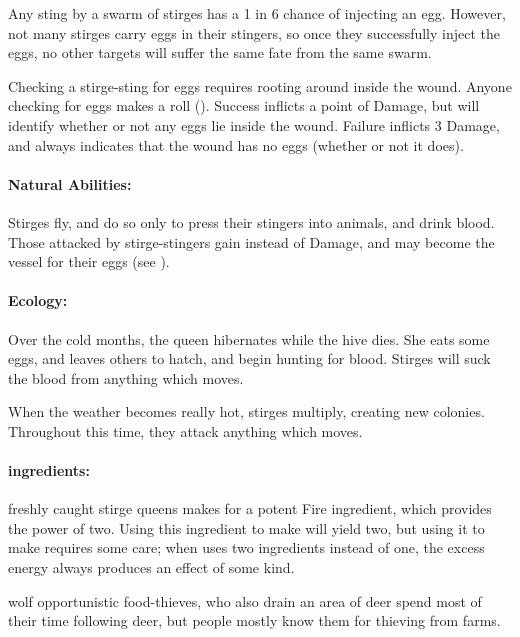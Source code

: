 \begin{multicols}{2}
\label{stirgeEggs}
Any sting by a swarm of stirges has a 1 in 6 chance of injecting an egg.
However, not many stirges carry eggs in their stingers, so once they successfully inject the eggs, no other targets will suffer the same fate from the same swarm.

Checking a stirge-sting for eggs requires rooting around inside the wound.
Anyone checking for eggs makes a  roll (\tn[12]).
Success inflicts a point of Damage, but will identify whether or not any eggs lie inside the wound.
Failure inflicts 3 Damage, and always indicates that the wound has no eggs (whether or not it does).

\paragraph{Natural Abilities:}
Stirges fly, and do so only to press their stingers into animals, and drink blood.
Those attacked by stirge-stingers gain  instead of Damage, and may become the vessel for their eggs (see ).

\paragraph{Ecology:}
Over the cold months, the queen hibernates while the hive dies.
She eats some eggs, and leaves others to hatch, and begin hunting for blood.
Stirges will suck the blood from anything which moves.

When the weather becomes really hot, stirges multiply, creating new colonies.
Throughout this time, they attack anything which moves.

\paragraph{\Glspl{ingredient}:}
freshly caught stirge queens makes for a potent Fire \gls{ingredient}, which provides the power of two.
Using this \gls{ingredient} to make  will yield two, but using it to make  requires some care; when  uses two \glspl{ingredient} instead of  one, the excess energy always produces an effect of some kind.%

\stirgeSwarm

  {wolf}%
  {opportunistic food-thieves, who also drain an area of deer}%
spend most of their time following deer, but people mostly know them for thieving from farms.


\end{multicols}
